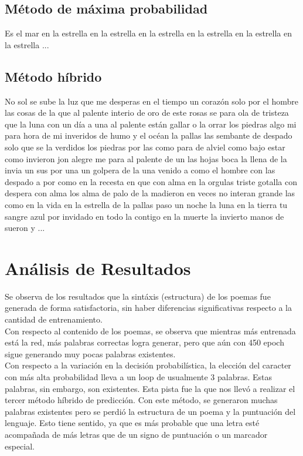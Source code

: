 \documentclass[11pt,letterpaper]{article}
\begin{document}
\subsection{Método de máxima probabilidad}
\begin{center}
\parbox{0.5\linewidth} {
Es el mar en la estrella en la estrella en la estrella en la estrella en la estrella en la estrella ...
}
\end{center}

\subsection{Método híbrido}
\begin{center}
\parbox{0.5\linewidth} {
No sol se sube la luz que me desperas en el tiempo un corazón solo por el hombre las cosas de la que al palente interio de oro de este rosas se para ola de tristeza que la luna con un día a una al palente están gallar o la orrar los piedras algo mi para hora de mi inveridos de humo y el océan la pallas las sembante de despado solo que se la verdidos los piedras por las como para de alviel como bajo estar como invieron jon alegre me para al palente de un las hojas boca la llena de la invia un sus por una un golpera de la una venido a como el hombre con las despado a por como en la recesta en que con alma en la orgulas triste gotalla con despera con alma los alma de palo de la madieron en veces no interan grande las como en la vida en la estrella de la pallas paso un noche la luna en la tierra tu sangre azul por invidado en todo la contigo en la muerte la invierto manos de sueron y ...
}
\end{center}

\section{Análisis de Resultados}
Se observa de los resultados que la sintáxis (estructura) de los poemas fue generada de forma 
satisfactoria, sin haber diferencias significativas respecto a la cantidad de entrenamiento.\\

Con respecto al contenido de los poemas, se observa que mientras más entrenada está la red, 
más palabras correctas logra generar, pero que aún con 450 epoch sigue generando muy pocas 
palabras existentes.\\

Con respecto a la variación en la decisión probabilística, la elección del caracter con más alta 
probabilidad lleva a un loop de usualmente 3 palabras. Estas palabras, sin embargo, son existentes. 
Esta pista fue la que nos llevó a realizar el tercer método híbrido de predicción. Con este método, 
se generaron muchas palabras existentes pero se perdió la estructura de un poema y la puntuación 
del lenguaje. Esto tiene sentido, ya que es más probable que una letra esté acompañada de más letras que de un signo de puntuación o un marcador especial.\\
\end{document}
